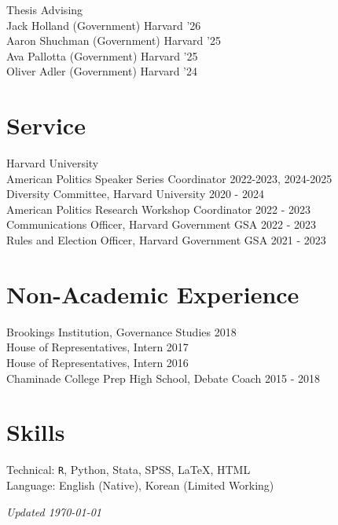 \documentclass[margin, line]{res}
\begin{document}
\begin{resume}
\hspace*{2.5mm} Thesis Advising \\
\hspace*{5mm} Jack Holland (Government) \hfill Harvard '26\\
\hspace*{5mm} Aaron Shuchman (Government) \hfill Harvard '25\\
\hspace*{5mm} Ava Pallotta (Government) \hfill Harvard '25\\
\hspace*{5mm} Oliver Adler (Government) \hfill Harvard '24

\section{Service}
Harvard University\\
\hspace*{5mm} American Politics Speaker Series Coordinator \hfill 2022-2023, 2024-2025\\
\hspace*{5mm} Diversity Committee, Harvard University \hfill 2020 - 2024\\
\hspace*{5mm} American Politics Research Workshop Coordinator \hfill 2022 - 2023\\
\hspace*{5mm} Communications Officer, Harvard Government GSA \hfill 2022 - 2023\\
\hspace*{5mm} Rules and Election Officer, Harvard Government GSA \hfill 2021 - 2023\\

\section{Non-Academic Experience}
Brookings Institution, Governance Studies \hfill 2018\\
House of Representatives, Intern \hfill 2017\\
House of Representatives, Intern \hfill 2016\\
Chaminade College Prep High School, Debate Coach \hfill 2015 - 2018

\section{Skills}
Technical: \texttt{R}, Python, Stata, SPSS, \LaTeX, HTML\\
Language: English (Native), Korean (Limited Working)

\vspace*{\fill}

\hfill \small{\textit{Updated \today}}

\end{resume}
\end{document}
